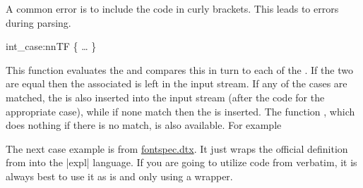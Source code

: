  A common error is to include the  code in curly brackets. This leads to errors during parsing. 
 
   
 
 
  \begin{docCommand}{int_case:nnTF} {
      \{ 
       
       
     \ldots 
       
     \} 
     }
     
   This function evaluates the  and
   compares this in turn to each of the
   . If the two are equal then the
   associated  is left in the input stream. If any of the
   cases are matched, the  is also inserted into the
   input stream (after the code for the appropriate case), while if none
   match then the  is inserted. The function
   , which does nothing if there is no match, is also
   available. For example
\end{docCommand}   
    
 
 
 The next case example is from \href{https://github.com/wspr/fontspec/blob/master/fontspec.dtx}{fontspec.dtx}. It just wraps the official \latexe definition from  into the |expl| language. If you are going to utilize code from \latexe verbatim, it is always best to use it as is and only using a wrapper.

